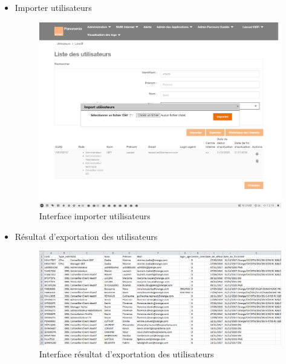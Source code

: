 \begin{itemize}
	\item Importer utilisateurs
	\begin{figure}[H]
		\centering
		\includegraphics[width=0.65\linewidth]{img/screenshots/users/import}
		\caption[Interface importer utilisateurs]{Interface importer utilisateurs}
		\label{fig:import-user-ihm}
	\end{figure}

	\item Résultat d'exportation des utilisateurs
	\begin{figure}[H]
		\centering
		\includegraphics[width=0.65\linewidth]{img/screenshots/users/export}
		\caption[Extrait de résultat d'exportation des utilisateurs]{Interface résultat d'exportation des utilisateurs}
		\label{fig:export-user-ihm}
	\end{figure}
\end{itemize}

